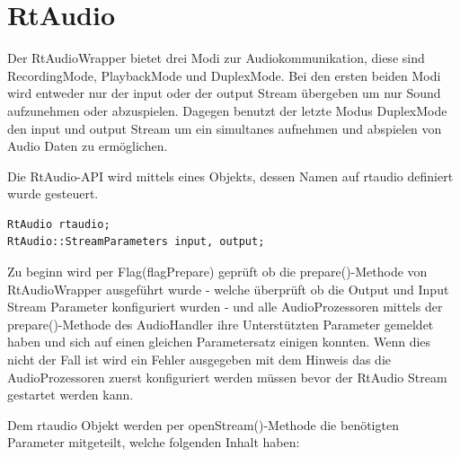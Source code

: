 \section{RtAudio}

Der RtAudioWrapper bietet drei Modi zur Audiokommunikation, diese sind RecordingMode, PlaybackMode und DuplexMode. Bei den ersten beiden Modi wird entweder nur der input oder der output Stream übergeben um nur Sound aufzunehmen oder abzuspielen. Dagegen benutzt der letzte Modus DuplexMode den input und output Stream um ein simultanes aufnehmen und abspielen von Audio Daten zu ermöglichen.

Die RtAudio-API wird mittels eines Objekts, dessen Namen auf rtaudio definiert wurde gesteuert.

\begin{lstlisting}[caption={RtAudio Objekt und StreamParameter},label={Code:RtAudio}]
RtAudio rtaudio;
RtAudio::StreamParameters input, output;
\end{lstlisting}

Zu beginn wird per Flag(flagPrepare) geprüft ob die prepare()-Methode von RtAudioWrapper ausgeführt wurde - welche überprüft ob die Output und Input Stream Parameter konfiguriert wurden - und alle AudioProzessoren mittels der prepare()-Methode des AudioHandler ihre Unterstützten Parameter gemeldet haben und sich auf einen gleichen Parametersatz einigen konnten. Wenn dies nicht der Fall ist wird ein Fehler ausgegeben mit dem Hinweis das die AudioProzessoren zuerst konfiguriert werden müssen bevor der RtAudio Stream gestartet werden kann.

Dem rtaudio Objekt werden per openStream()-Methode die benötigten Parameter mitgeteilt, welche folgenden Inhalt haben:


